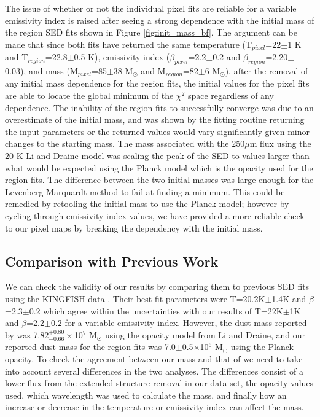 The issue of whether or not the individual pixel fits are reliable for a variable emissivity index is raised after seeing a strong dependence with the initial mass of the region SED fits shown in Figure \ref{fig:init_mass_bf}.  The argument can be made that since both fits have returned the same temperature (T$_{pixel}$=22$\pm$1 K and T$_{region}$=22.8$\pm$0.5 K), emissivity index ($\beta_{pixel}$=2.2$\pm$0.2 and $\beta_{region}$=2.20$\pm$0.03), and mass (M$_{pixel}$=85$\pm$38 M$_\odot$ and M$_{region}$=82$\pm$6 M$_\odot$), after the removal of any initial mass dependence for the region fits, the initial values for the pixel fits are able to locate the global minimum of the $\chi^2$ space regardless of any dependence.  The inability of the region fits to successfully converge was due to an overestimate of the initial mass, and was shown by the fitting routine returning the input parameters or the returned values would vary significantly given minor changes to the starting mass.  The mass associated with the 250$\mu$m flux using the 20 K Li and Draine model was scaling the peak of the SED to values larger than what would be expected using the Planck model which is the opacity used for the region fits.  The difference between the two initial masses was large enough for the Levenberg-Marquardt method to fail at finding a minimum.  This could be remedied by retooling the initial mass to use the Planck model; however by cycling through emissivity index values, we have provided a more reliable check to our pixel maps by breaking the dependency with the initial mass.

\subsection{Comparison with Previous Work}

We can check the validity of our results by comparing them to previous SED fits using the KINGFISH data \citep{galametz2012}.  Their best fit parameters were T=20.2K$\pm$1.4K and $\beta$=2.3$\pm$0.2 which agree within the uncertainties with our results of T=22K$\pm$1K and $\beta$=2.2$\pm$0.2 for a variable emissivity index.  However, the dust mass reported by \cite{galametz2012} was 7.82$^{+0.80}_{-0.66}\times$10$^7$ M$_\odot$ using the opacity model from Li and Draine, and our reported dust mass for the region fits was 7.0$\pm$0.5$\times$10$^6$ M$_\odot$ using the Planck opacity.  To check the agreement between our mass and that of \cite{galametz2012} we need to take into account several differences in the two analyses. The differences consist of a lower flux from the extended structure removal in our data set, the opacity values used, which wavelength was used to calculate the mass, and finally how an increase or decrease in the temperature or emissivity index can affect the mass.  

